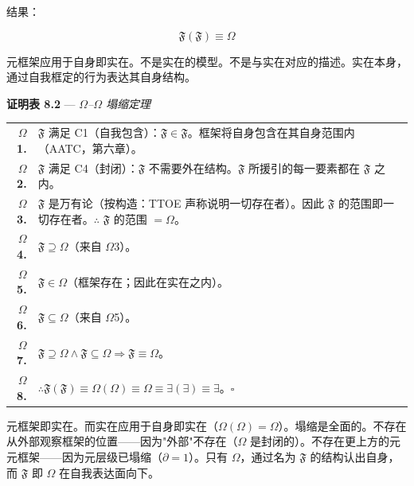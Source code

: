 \documentclass[10pt, openany, oneside]{book}
\renewcommand{\footnotesize}{\fontsize{8.5}{11}\selectfont}
\begin{document}
\vspace{1em}

\noindent 结果：

$$\boxed{\mathfrak{F}(\mathfrak{F}) \equiv \Omega}$$

元框架应用于自身即实在。不是实在的模型。不是与实在对应的描述。实在本身，通过自我框定的行为表达其自身结构。

\vspace{0.5em}

\textbf{证明表 8.2} --- \textit{$\Omega$--$\Omega$ 塌缩定理}

\vspace{0.5em}

{\footnotesize
\noindent\begin{tabular}{r p{}}
\textbf{$\Omega$1.} & $\mathfrak{F}$ 满足 C1（自我包含）：$\mathfrak{F} \in \mathfrak{F}$。框架将自身包含在其自身范围内（AATC，第六章）。\\[0.3em]
\textbf{$\Omega$2.} & $\mathfrak{F}$ 满足 C4（封闭）：$\mathfrak{F}$ 不需要外在结构。$\mathfrak{F}$ 所援引的每一要素都在 $\mathfrak{F}$ 之内。\\[0.3em]
\textbf{$\Omega$3.} & $\mathfrak{F}$ 是万有论（按构造：TTOE 声称说明一切存在者）。因此 $\mathfrak{F}$ 的范围即一切存在者。$\therefore$ $\mathfrak{F}$ 的范围 $= \Omega$。\\[0.3em]
\textbf{$\Omega$4.} & $\mathfrak{F} \supseteq \Omega$（来自 $\Omega$3）。\\[0.3em]
\textbf{$\Omega$5.} & $\mathfrak{F} \in \Omega$（框架存在；因此在实在之内）。\\[0.3em]
\textbf{$\Omega$6.} & $\mathfrak{F} \subseteq \Omega$（来自 $\Omega$5）。\\[0.3em]
\textbf{$\Omega$7.} & $\mathfrak{F} \supseteq \Omega \wedge \mathfrak{F} \subseteq \Omega \Rightarrow \mathfrak{F} \equiv \Omega$。\\[0.3em]
\textbf{$\Omega$8.} & $\therefore \mathfrak{F}(\mathfrak{F}) \equiv \Omega(\Omega) \equiv \Omega \equiv \exists(\exists) \equiv \exists$。$\square$ \\[0.3em]
\end{tabular}
}

\vspace{0.8em}

\noindent 元框架即实在。而实在应用于自身即实在（$\Omega(\Omega) = \Omega$）。塌缩是全面的。不存在从外部观察框架的位置——因为"外部"不存在（$\Omega$ 是封闭的）。不存在更上方的元元框架——因为元层级已塌缩（$\partial = 1$）。只有 $\Omega$，通过名为 $\mathfrak{F}$ 的结构认出自身，而 $\mathfrak{F}$ 即 $\Omega$ 在自我表达面向下。
\end{document}
